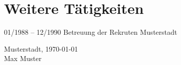 \documentclass[hidelinks]{friggeri-cv}
\newcommand{\Ort}{Musterstadt} %
\newcommand{\Unterschrift}{Max Muster}
\begin{document}
    \vspace*{-3ex}
    \section{Weitere Tätigkeiten}
    \begin{entrylist}
        \entry
        {01/1988 -- 12/1990}
        {Betreuung der Rekruten}
        {Musterstadt}
        {}
    \end{entrylist}
    \vspace*{1.75ex}
    \raggedright
    \textnormal\Ort, \textnormal\today\\[0.0ex]
    \textnormal\Unterschrift
\end{document}
